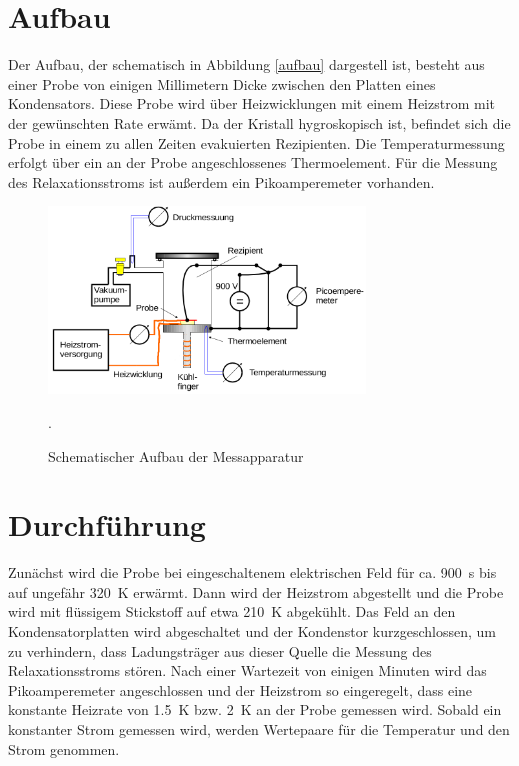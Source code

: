 \section{Aufbau}

Der Aufbau, der schematisch in Abbildung \autoref{aufbau} dargestell ist, besteht aus einer Probe von einigen Millimetern Dicke zwischen den Platten eines Kondensators. Diese Probe wird über Heizwicklungen mit einem Heizstrom mit der gewünschten Rate erwämt. Da der Kristall hygroskopisch ist, befindet sich die Probe in einem zu allen Zeiten evakuierten Rezipienten. Die Temperaturmessung erfolgt über ein an der Probe angeschlossenes Thermoelement. Für die Messung des Relaxationsstroms ist außerdem ein Pikoamperemeter vorhanden.
\begin{figure}
  \centering
  \includegraphics[width=0.75\textwidth]{img/aufbau.png}
  \caption{Schematischer Aufbau der Messapparatur \cite{FP}}.
  \label{aufbau}
\end{figure}

\FloatBarrier

\section{Durchf\"{u}hrung}

Zunächst wird die Probe bei eingeschaltenem elektrischen Feld für ca. \SI{900}{\second} bis auf ungefähr \SI{320}{\kelvin} erwärmt. Dann wird der Heizstrom abgestellt und die Probe wird mit flüssigem Stickstoff auf etwa \SI{210}{\kelvin} abgekühlt. Das Feld an den Kondensatorplatten wird abgeschaltet und der Kondenstor kurzgeschlossen, um zu verhindern, dass Ladungsträger aus dieser Quelle die Messung des Relaxationsstroms stören. Nach einer Wartezeit von einigen Minuten wird das Pikoamperemeter angeschlossen und der Heizstrom so eingeregelt, dass eine konstante Heizrate von \SI{1.5}{\kelvin} bzw. \SI{2}{\kelvin} an der Probe gemessen wird. Sobald ein konstanter Strom gemessen wird, werden Wertepaare für die Temperatur und den Strom genommen.
